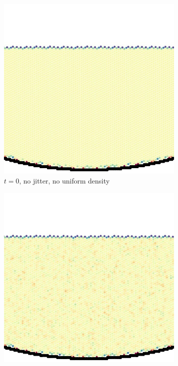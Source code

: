 \begin{figure}[hbt]
  \begin{subfigure}[t]{0.3\textwidth}
    \centering
    \includegraphics*[width=\textwidth]{images/density/0.0shex0j.jpg}
    \caption{$t=0$, no jitter, no uniform density}
    \label{fig:jitter-and-uniform-density-njndt0}
  \end{subfigure}
  \begin{subfigure}[t]{0.3\textwidth}
    \centering
    \includegraphics*[width=\textwidth]{images/density/0.0shex2.5j.jpg}

\end{subfigure}
\end{figure}
